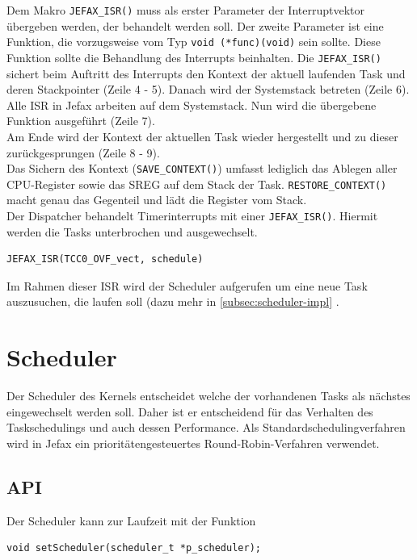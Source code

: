 \documentclass[fontsize=12pt, toc=bibliography, notitlepage]{scrreprt}
\newcommand{\refnn}[1]{\ref{#1} \nameref{#1}}
\begin{document}
Dem Makro \lstinline$JEFAX_ISR()$ muss als erster Parameter der Interruptvektor übergeben werden, der behandelt werden soll. Der zweite Parameter ist eine Funktion, die vorzugsweise vom Typ \lstinline$void (*func)(void)$ sein sollte. Diese Funktion sollte die Behandlung des Interrupts beinhalten. Die \lstinline$JEFAX_ISR()$ sichert beim Auftritt des Interrupts den Kontext der aktuell laufenden Task und deren Stackpointer (Zeile 4 - 5). Danach wird der Systemstack betreten (Zeile 6). Alle ISR in Jefax arbeiten auf dem Systemstack. Nun wird die übergebene Funktion ausgeführt (Zeile 7).\\
Am Ende wird der Kontext der aktuellen Task wieder hergestellt und zu dieser zurückgesprungen (Zeile 8 - 9).\\
Das Sichern des Kontext (\lstinline$SAVE_CONTEXT()$) umfasst lediglich das Ablegen aller CPU-Register sowie das SREG auf dem Stack der Task. \lstinline$RESTORE_CONTEXT()$ macht genau das Gegenteil und lädt die Register vom Stack.\\
Der Dispatcher behandelt Timerinterrupts mit einer \lstinline$JEFAX_ISR()$. Hiermit werden die Tasks unterbrochen und ausgewechselt.

\begin{lstlisting}[title=dispatcher.c]
JEFAX_ISR(TCC0_OVF_vect, schedule)
\end{lstlisting}

Im Rahmen dieser ISR wird der Scheduler aufgerufen um eine neue Task auszusuchen, die laufen soll (dazu mehr in \refnn{subsec:scheduler-impl}.

\newpage

\section{Scheduler}
\label{sec:scheduler}
Der Scheduler des Kernels entscheidet welche der vorhandenen Tasks als nächstes eingewechselt werden soll. Daher ist er entscheidend für das Verhalten des Taskschedulings und auch dessen Performance. Als Standardschedulingverfahren wird in Jefax ein prioritätengesteuertes Round-Robin-Verfahren verwendet.

\subsection{API}
\label{subsec:scheduler-api}
Der Scheduler kann zur Laufzeit mit der Funktion

\begin{lstlisting}
void setScheduler(scheduler_t *p_scheduler);
\end{lstlisting}
\end{document}
